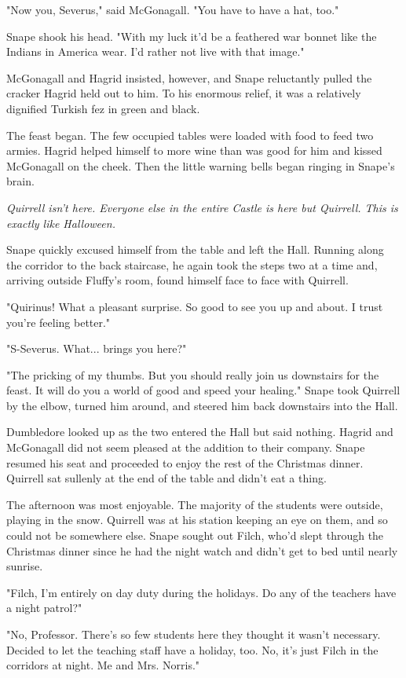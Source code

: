 \documentclass[a4paper,11pt]{article}
\begin{document}
"Now you, Severus," said McGonagall. "You have to have a hat, too."

Snape shook his head. "With my luck it'd be a feathered war bonnet like the Indians in America wear. I'd rather not live with that image."

McGonagall and Hagrid insisted, however, and Snape reluctantly pulled the cracker Hagrid held out to him. To his enormous relief, it was a relatively dignified Turkish fez in green and black.

The feast began. The few occupied tables were loaded with food to feed two armies. Hagrid helped himself to more wine than was good for him and kissed McGonagall on the cheek. Then the little warning bells began ringing in Snape's brain.

\emph{Quirrell isn't here. Everyone else in the entire Castle is here but Quirrell. This is exactly like Halloween.}

Snape quickly excused himself from the table and left the Hall. Running along the corridor to the back staircase, he again took the steps two at a time and, arriving outside Fluffy's room, found himself face to face with Quirrell.

"Quirinus! What a pleasant surprise. So good to see you up and about. I trust you're feeling better."

"S-Severus. What... brings you here?"

"The pricking of my thumbs. But you should really join us downstairs for the feast. It will do you a world of good and speed your healing." Snape took Quirrell by the elbow, turned him around, and steered him back downstairs into the Hall.

Dumbledore looked up as the two entered the Hall but said nothing. Hagrid and McGonagall did not seem pleased at the addition to their company. Snape resumed his seat and proceeded to enjoy the rest of the Christmas dinner. Quirrell sat sullenly at the end of the table and didn't eat a thing.

The afternoon was most enjoyable. The majority of the students were outside, playing in the snow. Quirrell was at his station keeping an eye on them, and so could not be somewhere else. Snape sought out Filch, who'd slept through the Christmas dinner since he had the night watch and didn't get to bed until nearly sunrise.

"Filch, I'm entirely on day duty during the holidays. Do any of the teachers have a night patrol?"

"No, Professor. There's so few students here they thought it wasn't necessary. Decided to let the teaching staff have a holiday, too. No, it's just Filch in the corridors at night. Me and Mrs. Norris."
\end{document}
